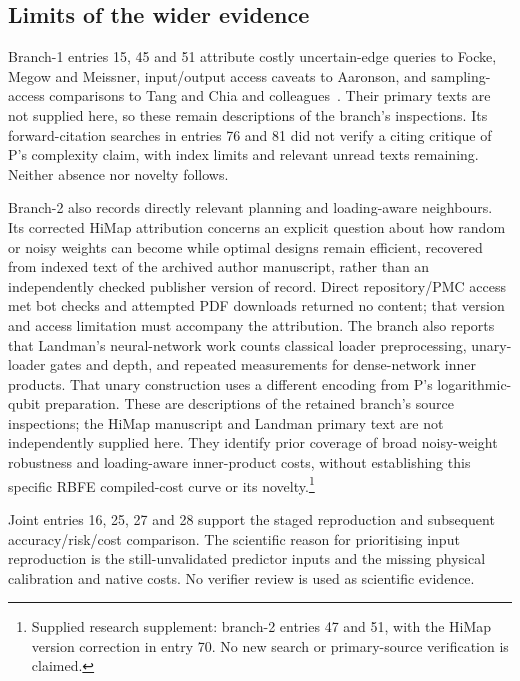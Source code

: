 \documentclass{article}
\begin{document}
\subsection{Limits of the wider evidence}

Branch-1 entries 15, 45 and 51 attribute costly uncertain-edge queries to Focke, Megow and Meissner, input/output access caveats to Aaronson, and sampling-access comparisons to Tang and Chia and colleagues~\cite{queries,fineprint,Tang,Chia}. Their primary texts are not supplied here, so these remain descriptions of the branch's inspections. Its forward-citation searches in entries 76 and 81 did not verify a citing critique of P's complexity claim, with index limits and relevant unread texts remaining. Neither absence nor novelty follows.

Branch-2 also records directly relevant planning and loading-aware neighbours. Its corrected HiMap attribution concerns an explicit question about how random or noisy weights can become while optimal designs remain efficient, recovered from indexed text of the archived author manuscript, rather than an independently checked publisher version of record. Direct repository/PMC access met bot checks and attempted PDF downloads returned no content; that version and access limitation must accompany the attribution. The branch also reports that Landman's neural-network work counts classical loader preprocessing, unary-loader gates and depth, and repeated measurements for dense-network inner products. That unary construction uses a different encoding from P's logarithmic-qubit preparation. These are descriptions of the retained branch's source inspections; the HiMap manuscript and Landman primary text are not independently supplied here. They identify prior coverage of broad noisy-weight robustness and loading-aware inner-product costs, without establishing this specific RBFE compiled-cost curve or its novelty.\footnote{Supplied research supplement: branch-2 entries 47 and 51, with the HiMap version correction in entry 70. No new search or primary-source verification is claimed.}

Joint entries 16, 25, 27 and 28 support the staged reproduction and subsequent accuracy/risk/cost comparison. The scientific reason for prioritising input reproduction is the still-unvalidated predictor inputs and the missing physical calibration and native costs. No verifier review is used as scientific evidence.



\end{document}
